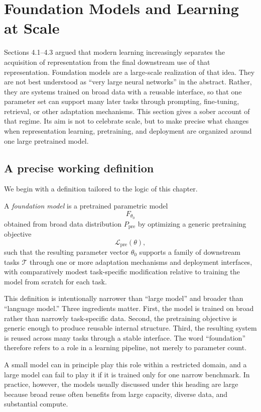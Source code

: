 \section{Foundation Models and Learning at Scale}

Sections 4.1--4.3 argued that modern learning increasingly separates the acquisition of representation from the final downstream use of that representation.
Foundation models are a large-scale realization of that idea.
They are not best understood as ``very large neural networks'' in the abstract.
Rather, they are systems trained on broad data with a reusable interface, so that one parameter set can support many later tasks through prompting, fine-tuning, retrieval, or other adaptation mechanisms.
This section gives a sober account of that regime.
Its aim is not to celebrate scale, but to make precise what changes when representation learning, pretraining, and deployment are organized around one large pretrained model.

\subsection*{A precise working definition}

We begin with a definition tailored to the logic of this chapter.

\begin{definition}
A \emph{foundation model} is a pretrained parametric model
\[
F_{\theta_0}
\]
obtained from broad data distribution $P_{\mathrm{pre}}$ by optimizing a generic pretraining objective
\[
\mathcal{L}_{\mathrm{pre}}(\theta),
\]
such that the resulting parameter vector $\theta_0$ supports a family of downstream tasks $\mathcal{T}$ through one or more adaptation mechanisms and deployment interfaces, with comparatively modest task-specific modification relative to training the model from scratch for each task.
\end{definition}

This definition is intentionally narrower than ``large model'' and broader than ``language model.''
Three ingredients matter.
First, the model is trained on broad rather than narrowly task-specific data.
Second, the pretraining objective is generic enough to produce reusable internal structure.
Third, the resulting system is reused across many tasks through a stable interface.
The word ``foundation'' therefore refers to a role in a learning pipeline, not merely to parameter count.

A small model can in principle play this role within a restricted domain, and a large model can fail to play it if it is trained only for one narrow benchmark.
In practice, however, the models usually discussed under this heading are large because broad reuse often benefits from large capacity, diverse data, and substantial compute.


